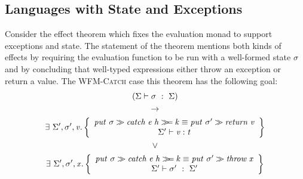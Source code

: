 \subsection{Languages with State and Exceptions}

Consider the effect theorem which fixes the evaluation monad to
support exceptions and state. The statement of the theorem mentions
both kinds of effects by requiring the evaluation function to be run
with a well-formed state $\sigma$ and by concluding that well-typed
expressions either throw an exception or return a value. The
\textsc{WFM-Catch} case this theorem has the following goal:
\begin{gather*}
(\Sigma \vdash \sigma~:~\Sigma) \\ \rightarrow \\
\exists~\Sigma',\sigma',\ensuremath{\Varid{v}}.
\left\{\begin{array}{c}
\ensuremath{\Varid{put}}~\sigma \ensuremath{\sequ \Varid{catch}\;\Varid{e}\;\Varid{h}\bind \Varid{k}\equiv \Varid{put}}~\sigma' \ensuremath{\sequ \Varid{return}\;\Varid{v}} \\ \Sigma' \vdash \ensuremath{\Varid{v}} : \ensuremath{\Varid{t}} \\
\end{array}\right\} \\
\vee \\
\exists~\Sigma',\sigma',\ensuremath{\Varid{x}}.
\left\{\begin{array}{c}
\ensuremath{\Varid{put}}~\sigma \ensuremath{\sequ \Varid{catch}\;\Varid{e}\;\Varid{h}\bind \Varid{k}\equiv \Varid{put}}~\sigma' \ensuremath{\sequ \Varid{throw}\;\Varid{x}} \\
 \Sigma' \vdash \sigma'~:~\Sigma'
\end{array}\right\}
\end{gather*}

